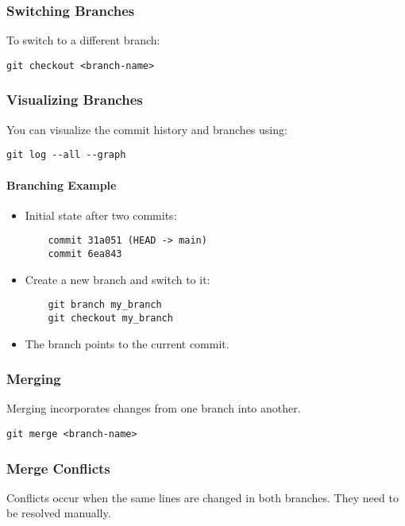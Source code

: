 \documentclass[12pt]{article}
\begin{document}
\subsubsection{Switching Branches}
To switch to a different branch:
\begin{lstlisting}
git checkout <branch-name>
\end{lstlisting}

\subsubsection{Visualizing Branches}
You can visualize the commit history and branches using:
\begin{lstlisting}
git log --all --graph
\end{lstlisting}

\paragraph{Branching Example}
\begin{itemize}
    \item Initial state after two commits:
    \begin{lstlisting}
    commit 31a051 (HEAD -> main)
    commit 6ea843
    \end{lstlisting}

    \item Create a new branch and switch to it:
    \begin{lstlisting}
    git branch my_branch
    git checkout my_branch
    \end{lstlisting}
    
    \item The branch points to the current commit.
\end{itemize}

\subsubsection{Merging}
Merging incorporates changes from one branch into another.
\begin{lstlisting}
git merge <branch-name>
\end{lstlisting}

\subsubsection{Merge Conflicts}
Conflicts occur when the same lines are changed in both branches. They need to be resolved manually.
\end{document}
